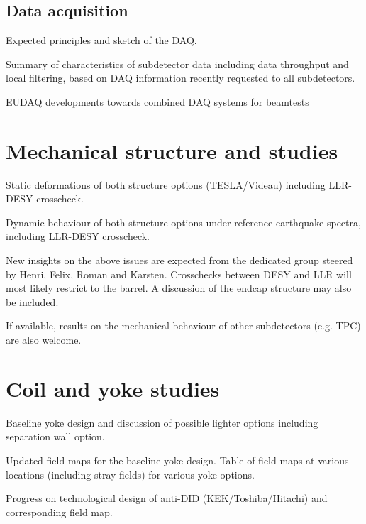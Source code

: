 \subsection{Data acquisition}

Expected principles and sketch of the DAQ.

Summary of characteristics of subdetector data including data throughput and local filtering, 
based on DAQ information recently requested to all subdetectors.

EUDAQ developments towards combined DAQ systems for beamtests

\vspace{2cm}

\section{Mechanical structure and studies}

Static deformations of both structure options (TESLA/Videau) including LLR-DESY crosscheck.

Dynamic behaviour of both structure options under reference earthquake spectra, including LLR-DESY crosscheck.

New insights on the above issues are expected from the dedicated group steered by Henri, Felix, Roman and Karsten. Crosschecks between DESY and LLR will most likely restrict to the barrel. A discussion of the endcap structure may also be included. 

If available, results on the mechanical behaviour of other subdetectors (e.g. TPC) are also welcome.

\vspace{2cm}

\section{Coil and yoke studies}

Baseline yoke design and discussion of possible lighter options including separation wall option.

Updated field maps for the baseline yoke design. Table of field maps at various locations (including stray fields) for various yoke options.

Progress on technological design of anti-DID (KEK/Toshiba/Hitachi) and corresponding field map.

